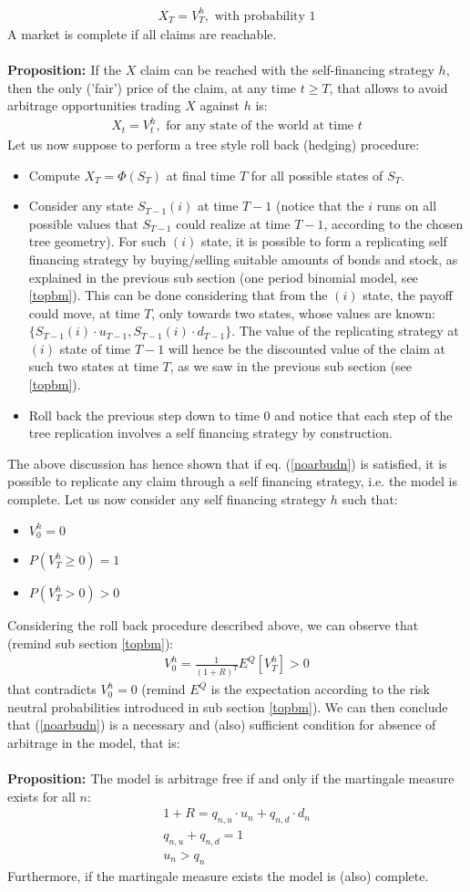 \documentclass[a4paper,10pt]{report}
\theoremstyle{plain}
\theoremstyle{definition}
\newcommand\be{\begin{eqnarray}}    %
\newcommand\ee{\end{eqnarray}}
\newcommand{\PROP} {{\bf{Proposition: }}}
\begin{document}
\be 
X_T=V^h_T, \mbox{ with probability $1$}
\ee
A market is complete if all claims are reachable. \\ \\
\PROP If the $X$ claim can be reached with the self-financing strategy $h$, then the only ('fair') price of the claim, at any time $t\ge T$, that allows to avoid arbitrage opportunities trading $X$ against $h$ is:
\be 
X_t = V^h_t, \mbox{ for any state of the world at time $t$}
\ee 
Let us now suppose to perform a tree style roll back (hedging) procedure:
\begin{itemize}
\item Compute $X_T=\Phi(S_T)$ at final time $T$ for all possible states of $S_T$.
\item Consider any state $S_{T-1}(i)$ at time $T-1$ (notice that the $i$ runs on all possible values that $S_{T-1}$ could realize at time $T-1$, according to the chosen tree geometry). For such $(i)$ state, it is possible to form a replicating self financing strategy by buying/selling suitable amounts of bonds and stock, as explained in the previous sub section (one period binomial model, see \ref{topbm}). This can be done considering that from the $(i)$ state, the payoff could move, at time $T$, only towards two states, whose values are known: $\{S_{T-1}(i)\cdot u_{T-1},S_{T-1}(i)\cdot d_{T-1} \}$. The value of the replicating strategy at $(i)$ state of time $T-1$ will hence be the discounted value of the claim at such two states at time $T$, as we saw in the previous sub section (see \ref{topbm}).
\item Roll back the previous step down to time $0$ and notice that each step of the tree replication involves a self financing strategy by construction.
\end{itemize}
The above discussion has hence shown that if eq. (\ref{noarbudn}) is satisfied, it is possible to replicate any claim through a self financing strategy, i.e. the model is complete.
Let us now consider any self financing strategy $h$ such that:
\begin{itemize}
\item $V^h_0=0$ 
\item $P\left(V^h_T \ge 0 \right)=1$
\item $P\left(V^h_T>0 \right)>0$
\end{itemize}
Considering the roll back procedure described above, we can observe that (remind sub section \ref{topbm}):
\be 
V^h_0=\frac{1}{(1+R)^T}E^Q\left[V^h_T\right]>0
\ee
that contradicts $V^h_0=0$ (remind $E^Q$ is the expectation according to the risk neutral probabilities introduced in sub section \ref{topbm}).
We can then conclude that (\ref{noarbudn}) is a necessary and (also) sufficient condition for absence of arbitrage in the model, that is: \\ \\
\PROP The model is arbitrage free if and only if the martingale measure exists for all $n$:
\be 
1+R = q_{n,u} \cdot u_n + q_{n,d} \cdot d_n \\
q_{n,u}+q_{n,d}=1\\
u_n>q_n
\ee
Furthermore, if the martingale measure exists the model is (also) complete.
\end{document}
